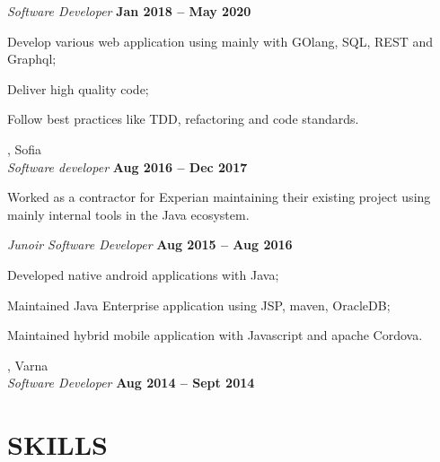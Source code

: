 \documentclass[margin,line]{resume}
\begin{document}
\begin{resume}
    \textsl{Software Developer} \hfill \textbf{Jan 2018 {--} May 2020}\\
    \begin{list2}
        \item Develop various web application using mainly with
          GOlang, SQL, REST and Graphql;
	\item Deliver high quality code;\@
        \item Follow best practices like TDD, refactoring and code standards.\@
    \end{list2}

    \textbf{}, Sofia \vspace{2mm}\\\vspace{1mm}%
    \textsl{Software developer} \hfill \textbf{Aug 2016 {--} Dec 2017}\\
    \begin{list2}
        \item Worked as a contractor for Experian maintaining their
          existing project using mainly internal tools in the Java
          ecosystem.
    \end{list2}

    \textsl{Junoir Software Developer} \hfill \textbf{Aug 2015 {--} Aug 2016}\\
    \begin{list2}
        \item Developed native android applications with Java;
	\item Maintained Java Enterprise application using JSP, maven, OracleDB;\@
        \item Maintained hybrid mobile application with Javascript and apache Cordova.
    \end{list2}

    \textbf{}, Varna \vspace{2mm}\\\vspace{1mm}%
    \textsl{Software Developer} \hfill \textbf{Aug 2014 {--} Sept 2014}


\sectionline%

    \section{\mysidestyle\textbf{\large{S}\small{KILLS}}}


\end{resume}
\end{document}
